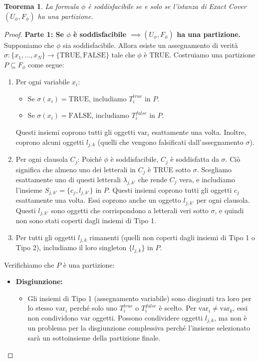 \documentclass[a4paper, 11pt]{book} %
\newtheorem{theorem}{Teorema}[section]
\theoremstyle{definition}
\begin{document}
\begin{theorem}
La formula $\phi$ è soddisfacibile se e solo se l'istanza di Exact Cover $(U_\phi, F_\phi)$ ha una partizione.
\end{theorem}
\begin{proof}
\textbf{Parte 1: Se $\phi$ è soddisfacibile $\implies (U_\phi, F_\phi)$ ha una partizione.}
Supponiamo che $\phi$ sia soddisfacibile. Allora esiste un assegnamento di verità $\sigma: \{x_1, \ldots, x_N\} \to \{\text{TRUE}, \text{FALSE}\}$ tale che $\phi$ è TRUE. Costruiamo una partizione $P \subseteq F_\phi$ come segue:
\begin{enumerate}
    \item Per ogni variabile $x_i$:
    \begin{itemize}
        \item Se $\sigma(x_i) = \text{TRUE}$, includiamo $T_i^{true}$ in $P$.
        \item Se $\sigma(x_i) = \text{FALSE}$, includiamo $T_i^{false}$ in $P$.
    \end{itemize}
    Questi insiemi coprono tutti gli oggetti $\text{var}_i$ esattamente una volta. Inoltre, coprono alcuni oggetti $l_{j,k}$ (quelli che vengono falsificati dall'assegnamento $\sigma$).
    \item Per ogni clausola $C_j$:
    Poiché $\phi$ è soddisfacibile, $C_j$ è soddisfatta da $\sigma$. Ciò significa che almeno uno dei letterali in $C_j$ è TRUE sotto $\sigma$. Scegliamo esattamente uno di questi letterali $\lambda_{j,k'}$ che rende $C_j$ vera, e includiamo l'insieme $S_{j,k'} = \{c_j, l_{j,k'}\}$ in $P$.
    Questi insiemi coprono tutti gli oggetti $c_j$ esattamente una volta. Essi coprono anche un oggetto $l_{j,k'}$ per ogni clausola. Questi $l_{j,k'}$ sono oggetti che corrispondono a letterali veri sotto $\sigma$, e quindi non sono stati coperti dagli insiemi di Tipo 1.
    \item Per tutti gli oggetti $l_{j,k}$ rimanenti (quelli non coperti dagli insiemi di Tipo 1 o Tipo 2), includiamo il loro singleton $\{l_{j,k}\}$ in $P$.
\end{enumerate}
Verifichiamo che $P$ è una partizione:
\begin{itemize}
    \item \textbf{Disgiunzione:}
    \begin{itemize}
        \item Gli insiemi di Tipo 1 (assegnamento variabile) sono disgiunti tra loro per lo stesso $\text{var}_i$ perché solo uno $T_i^{true}$ o $T_i^{false}$ è scelto. Per $\text{var}_i \ne \text{var}_k$, essi non condividono $\text{var}$ oggetti. Possono condividere oggetti $l_{j,k}$, ma non è un problema per la disgiunzione complessiva perché l'insieme selezionato sarà un sottoinsieme della partizione finale.

\end{itemize}
\end{itemize}
\end{proof}
\end{document}
